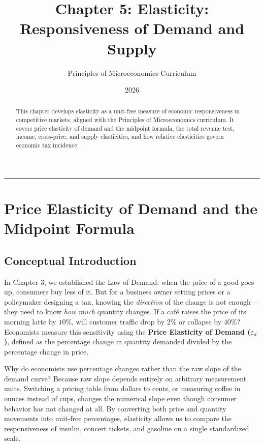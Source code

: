 \documentclass[11pt,letterpaper]{article}
\begin{document}
\title{\Huge\bfseries\color{SlateBlue} Chapter 5: Elasticity: Responsiveness of Demand and Supply}
\author{\large Principles of Microeconomics Curriculum}
\date{2026}
\maketitle

\thispagestyle{plain}

\begin{abstract}
This chapter develops elasticity as a unit-free measure of economic responsiveness in competitive markets, aligned with the Principles of Microeconomics curriculum. It covers price elasticity of demand and the midpoint formula, the total revenue test, income, cross-price, and supply elasticities, and how relative elasticities govern economic tax incidence.
\end{abstract}

\tableofcontents
\vspace{1.5em}
\hrule
\vspace{1.5em}

\section{Price Elasticity of Demand and the Midpoint Formula}

\subsection*{Conceptual Introduction}
In Chapter 3, we established the Law of Demand: when the price of a good goes up, consumers buy less of it. But for a business owner setting prices or a policymaker designing a tax, knowing the \emph{direction} of the change is not enough—they need to know \emph{how much} quantity changes. If a café raises the price of its morning latte by $10\%$, will customer traffic drop by $2\%$ or collapse by $40\%$? Economists measure this sensitivity using the \textbf{Price Elasticity of Demand ($\varepsilon_d$)}, defined as the percentage change in quantity demanded divided by the percentage change in price.

Why do economists use percentage changes rather than the raw slope of the demand curve? Because raw slope depends entirely on arbitrary measurement units. Switching a pricing table from dollars to cents, or measuring coffee in ounces instead of cups, changes the numerical slope even though consumer behavior has not changed at all. By converting both price and quantity movements into unit-free percentages, elasticity allows us to compare the responsiveness of insulin, concert tickets, and gasoline on a single standardized scale.
\end{document}
